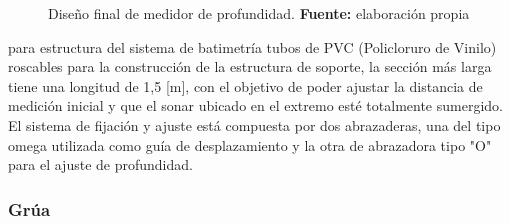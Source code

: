 \begin{figure}[h]
\centering
{}
\caption{Dise\~no final de medidor de profundidad. \textbf{Fuente:} elaboración propia}
\label{fig:batimetro}
\end{figure}

para estructura del sistema de batimetr\'ia tubos de PVC (Policloruro de Vinilo) roscables para la construcci\'on de la estructura de soporte, la secci\'on m\'as larga tiene una longitud de 1,5 [m], con el objetivo de poder ajustar la distancia de medici\'on inicial y que el sonar ubicado en el extremo est\'e totalmente sumergido. El sistema de fijaci\'on y ajuste est\'a compuesta por dos abrazaderas, una del tipo omega utilizada como gu\'ia de desplazamiento y la otra de abrazadora tipo "O" para el ajuste de profundidad. 


\subsubsection[Gr\'ua ]{Gr\'ua}
